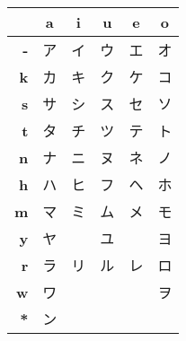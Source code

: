 \bigskip
\begin{center}
\Padding
\begin{tabular}{r||c|c|c|c|c|}
             & \textbf{a}& \textbf{i}& \textbf{u}& \textbf{e}& \textbf{o}\\ \hline \hline
\textbf{-}&ア&イ&ウ&エ&オ\\\hline
\textbf{k}&カ&キ&ク&ケ&コ\\\hline
\textbf{s}&サ&シ&ス&セ&ソ\\\hline
\textbf{t}&タ&チ&ツ&テ&ト\\\hline
\textbf{n}&ナ&ニ&ヌ&ネ&ノ\\\hline
\textbf{h}&ハ&ヒ&フ&ヘ&ホ\\\hline
\textbf{m}&マ&ミ&ム&メ&モ\\\hline
\textbf{y}&ヤ&  &ユ&  &ヨ\\\hline
\textbf{r}&ラ&リ&ル&レ&ロ\\\hline
\textbf{w}&ワ&  &  &  &ヲ\\\hline
\textbf{*}&ン&  &  &  &  \\\hline
\end{tabular}
\end{center}

